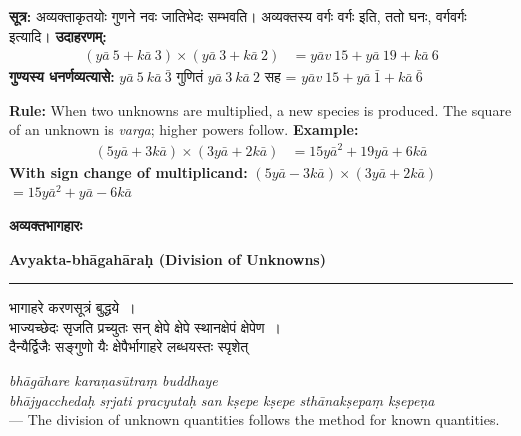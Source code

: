 \documentclass[11pt,a4paper]{article}
\newcommand{\dev}[1]{{\devanagarifont #1}}
\newcommand{\bicol}[2]{%
\noindent%
\begin{minipage}[t]{0.48\textwidth}
\begin{flushleft}
\small
#1
\end{flushleft}
\end{minipage}%
\hfill%
\begin{minipage}[t]{0.48\textwidth}
\begin{flushleft}
\small
#2
\end{flushleft}
\end{minipage}%
\vspace{0.4em}
}
\newcommand{\bicolverse}[2]{%
\par\noindent%
\begin{minipage}[t]{0.48\textwidth}
\centering
\color{versecolor}
\devanagarifont
\small
#1
\end{minipage}%
\hfill%
\begin{minipage}[t]{0.48\textwidth}
\centering
\color{versecolor}
\small
#2
\end{minipage}%
\par\vspace{0.4em}
}
\newcommand{\sectionbicol}[2]{%
\vspace{0.5em}
\noindent%
\begin{minipage}[t]{0.48\textwidth}
\begin{center}
\large\bfseries\color{sectioncolor}
\dev{#1}
\end{center}
\end{minipage}%
\hfill%
\begin{minipage}[t]{0.48\textwidth}
\begin{center}
\large\bfseries\color{sectioncolor}
#2
\end{center}
\end{minipage}%
\vspace{0.3em}
\noindent\rule{\textwidth}{0.4pt}
}
\begin{document}
\vspace{0.5cm}

\bicol{%
\textbf{सूत्र:} अव्यक्ताकृतयोः गुणने नवः जातिभेदः सम्भवति। अव्यक्तस्य वर्गः \dev{वर्गः} इति, ततो घनः, वर्गवर्गः इत्यादि।
\textbf{उदाहरणम्:}
\begin{align*}
(y\bar{a}\ 5 + k\bar{a}\ 3) \times (y\bar{a}\ 3 + k\bar{a}\ 2) &= y\bar{a}v\ 15 + y\bar{a}\ 19 + k\bar{a}\ 6
\end{align*}
\textbf{गुण्यस्य धनर्णव्यत्यासे:} $y\bar{a}\ 5\ k\bar{a}\ \bar{3}$ गुणितं $y\bar{a}\ 3\ k\bar{a}\ 2$ सह = $y\bar{a}v\ 15 + y\bar{a}\ \bar{1} + k\bar{a}\ \bar{6}$
}{%
\textbf{Rule:} When two unknowns are multiplied, a new species is produced. The square of an unknown is \textit{varga}; higher powers follow.
\textbf{Example:}
\begin{align*}
(5y\bar{a} + 3k\bar{a}) \times (3y\bar{a} + 2k\bar{a}) &= 15y\bar{a}^2 + 19y\bar{a} + 6k\bar{a}
\end{align*}
\textbf{With sign change of multiplicand:} $(5y\bar{a} - 3k\bar{a}) \times (3y\bar{a} + 2k\bar{a})$ $= 15y\bar{a}^2 + y\bar{a} - 6k\bar{a}$
}

\clearpage

\sectionbicol{अव्यक्तभागहारः}{Avyakta-bh\={a}gah\={a}ra\d{h} (Division of Unknowns)}

\vspace{0.3cm}

\bicolverse{%
भागाहरे करणसूत्रं बुद्धये~।\\
भाज्यच्छेदः सृजति प्रच्युतः सन् क्षेपे क्षेपे स्थानक्षेपं क्षेपेण~।\\
दैन्यैर्द्विजैः सङ्गुणो यैः क्षेपैर्भागाहरे लब्धयस्तः स्पृशेत्~
}{%
\textit{bh\={a}g\={a}hare kara\d{n}as\={u}tra\d{m} buddhaye}\\
\textit{bh\={a}jyaccheda\d{h} s\d{r}jati pracyuta\d{h} san k\d{s}epe k\d{s}epe sth\={a}nak\d{s}epa\d{m} k\d{s}epe\d{n}a}\\
--- The division of unknown quantities follows the method for known quantities.
}

\vspace{0.5cm}
\end{document}
